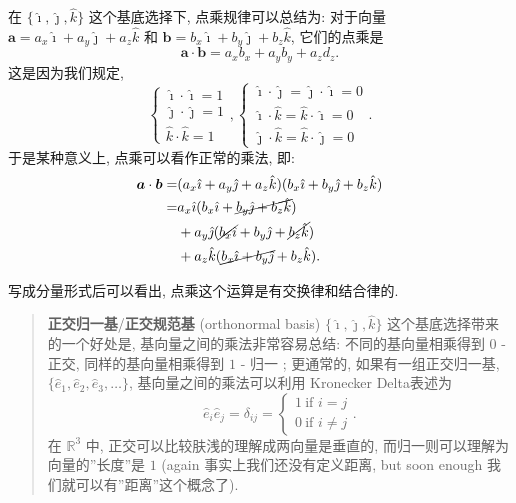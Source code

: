 在 \(\{\hat{\imath},\hat{\jmath},\hat{k}\}\) 这个基底选择下,
点乘规律可以总结为: 对于向量
\(\boldsymbol{a}=a_x\hat{\imath}+a_y\hat{\jmath}+a_z\hat{k}\) 和
\(\boldsymbol{b}=b_x\hat{\imath}+b_y\hat{\jmath}+b_z\hat{k}\),
它们的点乘是 \[
\boxed{\boldsymbol{a}\cdot\boldsymbol{b}=a_xb_x+a_yb_y+a_zd_z}.
\] 这是因为我们规定, \[
\begin{cases}
\hat{\imath}\cdot\hat{\imath}=1\\
\hat{\jmath}\cdot\hat{\jmath}=1\\
\hat{k}\cdot\hat{k}=1
\end{cases},
\begin{cases}
\hat{\imath}\cdot\hat{\jmath}=\hat{\jmath}\cdot\hat{\imath}=0\\
\hat{\imath}\cdot\hat{k}=\hat{k}\cdot\hat{\imath}=0\\
\hat{\jmath}\cdot\hat{k}=\hat{k}\cdot\hat{\jmath}=0
\end{cases}.
\] 于是某种意义上, 点乘可以看作正常的乘法, 即: \[
\begin{aligned}
\boldsymbol{a}\cdot\boldsymbol{b}=&(a_x\hat{\imath}+a_y\hat{\jmath}+a_z\hat{k})(b_x\hat{\imath}+b_y\hat{\jmath}+b_z\hat{k})\\
=&a_x\hat{\imath}(b_x\hat{\imath}+\cancel{b_y\hat{\jmath}+b_z\hat{k}})\\
&+a_y\hat{\jmath}(\cancel{b_x\hat{\imath}}+b_y\hat{\jmath}+\cancel{b_z\hat{k}})\\
&+a_z\hat{k}(\cancel{b_x\hat{\imath}+b_y\hat{\jmath}}+b_z\hat{k}).
\end{aligned}
\]

写成分量形式后可以看出, 点乘这个运算是有交换律和结合律的.

\begin{quote}
\textbf{正交归一基}/\textbf{正交规范基} (orthonormal basis)
\(\{\hat{\imath},\hat{\jmath},\hat{k}\}\) 这个基底选择带来的一个好处是,
基向量之间的乘法非常容易总结: 不同的基向量相乘得到 \(0\) - 正交,
同样的基向量相乘得到 \(1\) - 归一 ; 更通常的, 如果有一组正交归一基,
\(\{\hat{e}_1,\hat{e}_2,\hat{e}_3,…\}\), 基向量之间的乘法可以利用
Kronecker Delta表述为 \[
\hat{e}_i\hat{e}_j=\delta_{ij}=\begin{cases}1\ \text{if }i=j\\0\ \text{if }i\neq j\end{cases}.
\] 在 \(\mathbb{R}^3\) 中, 正交可以比较肤浅的理解成两向量是垂直的,
而归一则可以理解为向量的''长度''是 \(1\) (again
事实上我们还没有定义距离, but soon enough
我们就可以有''距离''这个概念了).
\end{quote}

